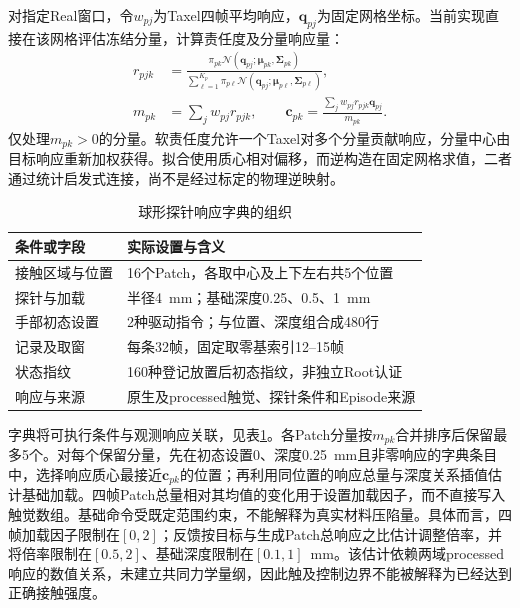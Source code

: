 对指定Real窗口，令$w_{pj}$为Taxel四帧平均响应，$\boldsymbol q_{pj}$为固定网格坐标。当前实现直接在该网格评估冻结分量，计算责任度及分量响应量：
\begin{equation}
 \begin{aligned}
 r_{pjk}&=\frac{\pi_{pk}\mathcal N(\boldsymbol q_{pj};\boldsymbol\mu_{pk},\boldsymbol\Sigma_{pk})}
 {\sum_{\ell=1}^{K_p}\pi_{p\ell}\mathcal N(\boldsymbol q_{pj};\boldsymbol\mu_{p\ell},\boldsymbol\Sigma_{p\ell})},\\
 m_{pk}&=\sum_j w_{pj}r_{pjk},\qquad
 \boldsymbol c_{pk}=\frac{\sum_j w_{pj}r_{pjk}\boldsymbol q_{pj}}{m_{pk}}.
 \end{aligned}
 \label{eq:ch05_gmm_responsibility}
\end{equation}
仅处理$m_{pk}>0$的分量。软责任度允许一个Taxel对多个分量贡献响应，分量中心由目标响应重新加权获得。拟合使用质心相对偏移，而逆构造在固定网格求值，二者通过统计启发式连接，尚不是经过标定的物理逆映射。

\begin{table}[htbp]
 \centering\small
 \caption{球形探针响应字典的组织}
 \label{tab:ch05_probe_dictionary}
 \begin{tabular}{p{}p{}}
 \hline
 条件或字段 & 实际设置与含义\\
 \hline
 接触区域与位置 & 16个Patch，各取中心及上下左右共5个位置\\
 探针与加载 & 半径4~mm；基础深度0.25、0.5、1~mm\\
 手部初态设置 & 2种驱动指令；与位置、深度组合成480行\\
 记录及取窗 & 每条32帧，固定取零基索引12--15帧\\
 状态指纹 & 160种登记放置后初态指纹，非独立Root认证\\
 响应与来源 & 原生及processed触觉、探针条件和Episode来源\\
 \hline
 \end{tabular}
\end{table}

字典将可执行条件与观测响应关联，见表\ref{tab:ch05_probe_dictionary}。各Patch分量按$m_{pk}$合并排序后保留最多5个。对每个保留分量，先在初态设置0、深度0.25~mm且非零响应的字典条目中，选择响应质心最接近$\boldsymbol c_{pk}$的位置；再利用同位置的响应总量与深度关系插值估计基础加载。四帧Patch总量相对其均值的变化用于设置加载因子，而不直接写入触觉数组。基础命令受既定范围约束，不能解释为真实材料压陷量。具体而言，四帧加载因子限制在$[0,2]$；反馈按目标与生成Patch总响应之比估计调整倍率，并将倍率限制在$[0.5,2]$、基础深度限制在$[0.1,1]$~mm。该估计依赖两域processed响应的数值关系，未建立共同力学量纲，因此触及控制边界不能被解释为已经达到正确接触强度。

